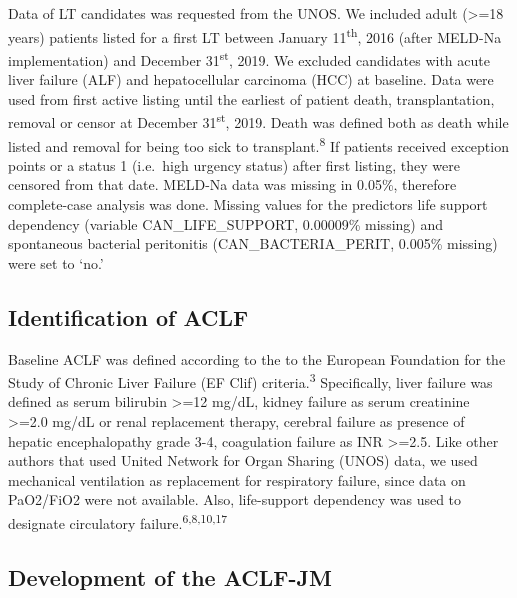 \documentclass[11pt,english,]{book} %
\begin{document}
Data of LT candidates was requested from the UNOS. We included adult (\textgreater=18 years) patients listed for a first LT between January 11\textsuperscript{th}, 2016 (after MELD-Na implementation) and December 31\textsuperscript{st}, 2019. We excluded candidates with acute liver failure (ALF) and hepatocellular carcinoma (HCC) at baseline. Data were used from first active listing until the earliest of patient death, transplantation, removal or censor at December 31\textsuperscript{st}, 2019. Death was defined both as death while listed and removal for being too sick to transplant.\textsuperscript{8} If patients received exception points or a status 1 (i.e.~high urgency status) after first listing, they were censored from that date. MELD-Na data was missing in 0.05\%, therefore complete-case analysis was done. Missing values for the predictors life support dependency (variable CAN\_LIFE\_SUPPORT, 0.00009\% missing) and spontaneous bacterial peritonitis (CAN\_BACTERIA\_PERIT, 0.005\% missing) were set to `no.'

\hypertarget{identification-of-aclf}{%
\subsection*{Identification of ACLF}\label{identification-of-aclf}}

Baseline ACLF was defined according to the to the European Foundation for the Study of Chronic Liver Failure (EF Clif) criteria.\textsuperscript{3} Specifically, liver failure was defined as serum bilirubin \textgreater=12 mg/dL, kidney failure as serum creatinine \textgreater=2.0 mg/dL or renal replacement therapy, cerebral failure as presence of hepatic encephalopathy grade 3-4, coagulation failure as INR \textgreater=2.5. Like other authors that used United Network for Organ Sharing (UNOS) data, we used mechanical ventilation as replacement for respiratory failure, since data on PaO2/FiO2 were not available. Also, life-support dependency was used to designate circulatory failure.\textsuperscript{6,8,10,17}

\hypertarget{development-of-the-aclf-jm}{%
\subsection*{Development of the ACLF-JM}\label{development-of-the-aclf-jm}}
\end{document}
